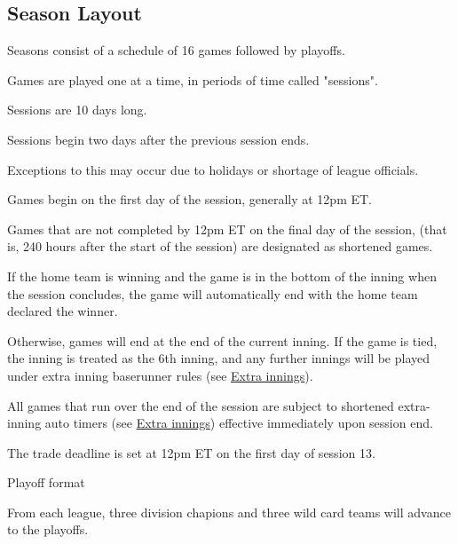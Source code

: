 
\subsection{Season Layout}
\begin{deepEnumerate}
	\item Seasons consist of a schedule of 16 games followed by playoffs.
	\item Games are played one at a time, in periods of time called "sessions".
	\begin{deepEnumerate}
		\item Sessions are 10 days long.
		\item Sessions begin two days after the previous session ends.
		\begin{deepEnumerate}
			\item Exceptions to this may occur due to holidays or shortage of league officials.
		\end{deepEnumerate}
		\item Games begin on the first day of the session, generally at 12pm ET.
		\item Games that are not completed by 12pm ET on the final day of the session,
		(that is, 240 hours after the start of the session)
		are designated as shortened games.
		\begin{deepEnumerate}
			\item If the home team is winning 
			and the game is in the bottom of the inning
			when the session concludes,
			the game will automatically end with the home team declared the winner.
			\item Otherwise, games will end at the end of the current inning.
			If the game is tied, the inning is treated as the 6th inning,
			and any further innings will be played under extra inning baserunner rules
			(see \hyperref[sec:extra innings]{Extra innings}).
			\item All games that run over the end of the session 
			are subject to shortened extra-inning auto timers
			(see \hyperref[sec:extra innings]{Extra innings}) 
			effective immediately upon session end.
		\end{deepEnumerate}
		\item The trade deadline is set at 12pm ET on the first day of session 13.
		\item Playoff format
		\begin{deepEnumerate}
			\item From each league, three division chapions and three wild card teams will advance to the playoffs.

\end{deepEnumerate}
\end{deepEnumerate}
\end{deepEnumerate}
